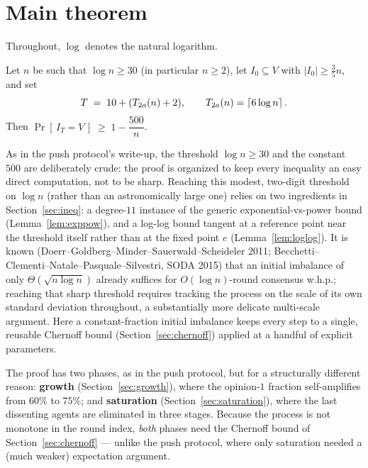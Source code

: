 \section{Main theorem}\label{sec:main-statement}

Throughout, $\log$ denotes the natural logarithm.

\begin{theorem}
  \label{thm:main}
  \leanok
  Let $n$ be such that $\log n \ge 30$ (in particular $n \ge 2$), let
  $I_0 \subseteq V$ with $|I_0| \ge \tfrac35 n$, and set
  \[
    T \;=\; 10 + (T_{2a}(n) + 2), \qquad T_{2a}(n) = \left\lceil 6\log n \right\rceil.
  \]
  Then $\Pr[\, I_T = V \,] \;\ge\; 1 - \dfrac{500}{n}$.
\end{theorem}

\begin{remark}
  As in the push protocol's write-up, the threshold $\log n \ge 30$ and
  the constant $500$ are deliberately crude: the proof is organized to keep
  every inequality an easy direct computation, not to be sharp. Reaching
  this modest, two-digit threshold on $\log n$ (rather than an
  astronomically large one) relies on two ingredients in
  Section~\ref{sec:ineq}: a degree-$11$ instance of the generic
  exponential-vs-power bound (Lemma~\ref{lem:exppow}), and a log-log bound
  tangent at a reference point near the threshold itself rather than at the
  fixed point $e$ (Lemma~\ref{lem:loglog}). It is known
  (Doerr--Goldberg--Minder--Sauerwald--Scheideler 2011;
  Becchetti--Clementi--Natale--Pasquale--Silvestri, SODA 2015) that an
  initial imbalance of only $\Theta(\sqrt{n\log n})$ already suffices for
  $O(\log n)$-round consensus w.h.p.; reaching that sharp threshold
  requires tracking the process on the scale of its own standard deviation
  throughout, a substantially more delicate multi-scale argument. Here a
  constant-fraction initial imbalance keeps every step to a single,
  reusable Chernoff bound (Section~\ref{sec:chernoff}) applied at a handful
  of explicit parameters.
\end{remark}

The proof has two phases, as in the push protocol, but for a structurally
different reason: \textbf{growth} (Section~\ref{sec:growth}), where the
opinion-$1$ fraction self-amplifies from $60\%$ to $75\%$; and
\textbf{saturation} (Section~\ref{sec:saturation}), where the last
dissenting agents are eliminated in three stages. Because the process is
not monotone in the round index, \emph{both} phases need the Chernoff bound
of Section~\ref{sec:chernoff} --- unlike the push protocol, where only
saturation needed a (much weaker) expectation argument.

